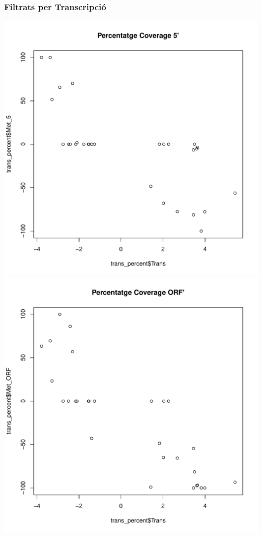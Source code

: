 \documentclass{article}\usepackage[]{graphicx}\usepackage[]{color}
\makeatletter
\def\maxwidth{ %
  \ifdim\Gin@nat@width>\linewidth
    \linewidth
  \else
    \Gin@nat@width
  \fi
}
\newenvironment{knitrout}{}{} %
\makeatother
\begin{document}
\subsubsection{Filtrats per Transcripció}
\begin{knitrout}
\color{fgcolor}

{\centering \includegraphics[width=\maxwidth]{figure/minimal-correlacions_trans-1} 
\includegraphics[width=\maxwidth]{figure/minimal-correlacions_trans-2} 
}
\end{knitrout}
\end{document}

